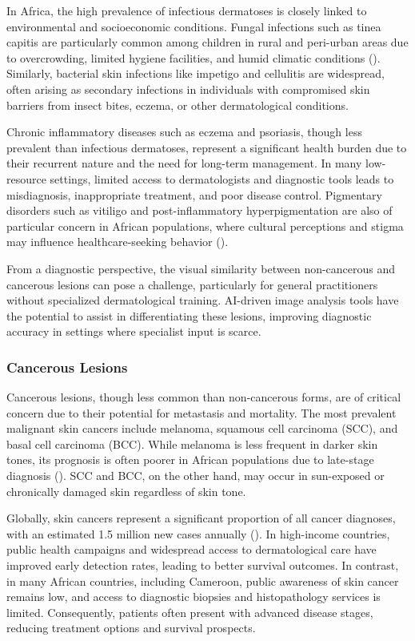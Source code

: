 \documentclass[
  12pt,
  oneside]{article}
\begin{document}
In Africa, the high prevalence of infectious dermatoses is closely
linked to environmental and socioeconomic conditions. Fungal infections
such as tinea capitis are particularly common among children in rural
and peri-urban areas due to overcrowding, limited hygiene facilities,
and humid climatic conditions (). Similarly, bacterial skin infections like impetigo and
cellulitis are widespread, often arising as secondary infections in
individuals with compromised skin barriers from insect bites, eczema, or
other dermatological conditions.

Chronic inflammatory diseases such as eczema and psoriasis, though less
prevalent than infectious dermatoses, represent a significant health
burden due to their recurrent nature and the need for long-term
management. In many low-resource settings, limited access to
dermatologists and diagnostic tools leads to misdiagnosis, inappropriate
treatment, and poor disease control. Pigmentary disorders such as
vitiligo and post-inflammatory hyperpigmentation are also of particular
concern in African populations, where cultural perceptions and stigma
may influence healthcare-seeking behavior
().

From a diagnostic perspective, the visual similarity between
non-cancerous and cancerous lesions can pose a challenge, particularly
for general practitioners without specialized dermatological training.
AI-driven image analysis tools have the potential to assist in
differentiating these lesions, improving diagnostic accuracy in settings
where specialist input is scarce.

\subsubsection{Cancerous Lesions}\label{cancerous-lesions}

Cancerous lesions, though less common than non-cancerous forms, are of
critical concern due to their potential for metastasis and mortality.
The most prevalent malignant skin cancers include melanoma, squamous
cell carcinoma (SCC), and basal cell carcinoma (BCC). While melanoma is
less frequent in darker skin tones, its prognosis is often poorer in
African populations due to late-stage diagnosis
(). SCC and BCC, on the
other hand, may occur in sun-exposed or chronically damaged skin
regardless of skin tone.

Globally, skin cancers represent a significant proportion of all cancer
diagnoses, with an estimated 1.5 million new cases annually
(). In high-income
countries, public health campaigns and widespread access to
dermatological care have improved early detection rates, leading to
better survival outcomes. In contrast, in many African countries,
including Cameroon, public awareness of skin cancer remains low, and
access to diagnostic biopsies and histopathology services is limited.
Consequently, patients often present with advanced disease stages,
reducing treatment options and survival prospects.
\end{document}
